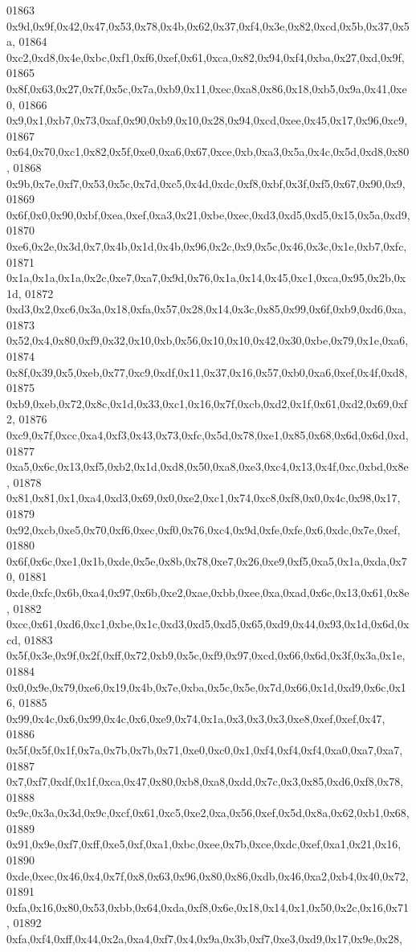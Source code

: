 \begin{DoxyCode}
01863   0x9d,0x9f,0x42,0x47,0x53,0x78,0x4b,0x62,0x37,0xf4,0x3e,0x82,0xcd,0x5b,0x37,0x5a,
01864   0xc2,0xd8,0x4e,0xbc,0xf1,0xf6,0xef,0x61,0xca,0x82,0x94,0xf4,0xba,0x27,0xd,0x9f,
01865   0x8f,0x63,0x27,0x7f,0x5c,0x7a,0xb9,0x11,0xec,0xa8,0x86,0x18,0xb5,0x9a,0x41,0xe0,
01866   0x9,0x1,0xb7,0x73,0xaf,0x90,0xb9,0x10,0x28,0x94,0xcd,0xee,0x45,0x17,0x96,0xc9,
01867   0x64,0x70,0xc1,0x82,0x5f,0xe0,0xa6,0x67,0xce,0xb,0xa3,0x5a,0x4c,0x5d,0xd8,0x80,
01868   0x9b,0x7e,0xf7,0x53,0x5c,0x7d,0xc5,0x4d,0xdc,0xf8,0xbf,0x3f,0xf5,0x67,0x90,0x9,
01869   0x6f,0x0,0x90,0xbf,0xea,0xef,0xa3,0x21,0xbe,0xec,0xd3,0xd5,0xd5,0x15,0x5a,0xd9,
01870   0xe6,0x2e,0x3d,0x7,0x4b,0x1d,0x4b,0x96,0x2c,0x9,0x5c,0x46,0x3c,0x1e,0xb7,0xfc,
01871   0x1a,0x1a,0x1a,0x2c,0xe7,0xa7,0x9d,0x76,0x1a,0x14,0x45,0xc1,0xca,0x95,0x2b,0x1d,
01872   0xd3,0x2,0xc6,0x3a,0x18,0xfa,0x57,0x28,0x14,0x3c,0x85,0x99,0x6f,0xb9,0xd6,0xa,
01873   0x52,0x4,0x80,0xf9,0x32,0x10,0xb,0x56,0x10,0x10,0x42,0x30,0xbe,0x79,0x1e,0xa6,
01874   0x8f,0x39,0x5,0xeb,0x77,0xc9,0xdf,0x11,0x37,0x16,0x57,0xb0,0xa6,0xef,0x4f,0xd8,
01875   0xb9,0xeb,0x72,0x8c,0x1d,0x33,0xc1,0x16,0x7f,0xcb,0xd2,0x1f,0x61,0xd2,0x69,0xf2,
01876   0xc9,0x7f,0xcc,0xa4,0xf3,0x43,0x73,0xfc,0x5d,0x78,0xe1,0x85,0x68,0x6d,0x6d,0xd,
01877   0xa5,0x6c,0x13,0xf5,0xb2,0x1d,0xd8,0x50,0xa8,0xe3,0xc4,0x13,0x4f,0xc,0xbd,0x8e,
01878   0x81,0x81,0x1,0xa4,0xd3,0x69,0x0,0xe2,0xc1,0x74,0xc8,0xf8,0x0,0x4c,0x98,0x17,
01879   0x92,0xcb,0xe5,0x70,0xf6,0xec,0xf0,0x76,0xc4,0x9d,0xfe,0xfe,0x6,0xdc,0x7e,0xef,
01880   0x6f,0x6c,0xe1,0x1b,0xde,0x5e,0x8b,0x78,0xe7,0x26,0xe9,0xf5,0xa5,0x1a,0xda,0x70,
01881   0xde,0xfc,0x6b,0xa4,0x97,0x6b,0xe2,0xae,0xbb,0xee,0xa,0xad,0x6c,0x13,0x61,0x8e,
01882   0xcc,0x61,0xd6,0xc1,0xbe,0x1c,0xd3,0xd5,0xd5,0x65,0xd9,0x44,0x93,0x1d,0x6d,0xcd,
01883   0x5f,0x3e,0x9f,0x2f,0xff,0x72,0xb9,0x5c,0xf9,0x97,0xcd,0x66,0x6d,0x3f,0x3a,0x1e,
01884   0x0,0x9e,0x79,0xe6,0x19,0x4b,0x7e,0xba,0x5c,0x5e,0x7d,0x66,0x1d,0xd9,0x6c,0x16,
01885   0x99,0x4c,0x6,0x99,0x4c,0x6,0xe9,0x74,0x1a,0x3,0x3,0x3,0xe8,0xef,0xef,0x47,
01886   0x5f,0x5f,0x1f,0x7a,0x7b,0x7b,0x71,0xe0,0xc0,0x1,0xf4,0xf4,0xf4,0xa0,0xa7,0xa7,
01887   0x7,0xf7,0xdf,0x1f,0xca,0x47,0x80,0xb8,0xa8,0xdd,0x7c,0x3,0x85,0xd6,0xf8,0x78,
01888   0x9c,0x3a,0x3d,0x9c,0xcf,0x61,0xc5,0xe2,0xa,0x56,0xef,0x5d,0x8a,0x62,0xb1,0x68,
01889   0x91,0x9e,0xf7,0xff,0xe5,0xf,0xa1,0xbc,0xee,0x7b,0xce,0xdc,0xef,0xa1,0x21,0x16,
01890   0xde,0xec,0x46,0x4,0x7f,0x8,0x63,0x96,0x80,0x86,0xdb,0x46,0xa2,0xb4,0x40,0x72,
01891   0xfa,0x16,0x80,0x53,0xbb,0x64,0xda,0xf8,0x6e,0x18,0x14,0x1,0x50,0x2c,0x16,0x71,
01892   0xfa,0xf4,0xff,0x44,0x2a,0xa4,0xf7,0x4,0x9a,0x3b,0xf7,0xe3,0xd9,0x17,0x9e,0x28,

\end{DoxyCode}
